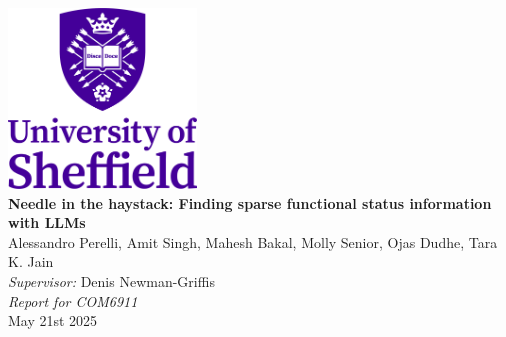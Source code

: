 \documentclass[11pt,oneside]{book}
\begin{document}
\frontmatter

\begin{titlepage}

\begin{center}
\includegraphics[width=5cm]{images/UOSLogo_Portrait_Violet_RGB.png}\\[2cm]
\linespread{1.2}\huge {\bfseries Needle in the haystack: Finding sparse functional status
information with LLMs}\\[2cm]
\linespread{1}
{\Large Alessandro Perelli, Amit Singh, Mahesh Bakal, Molly Senior, Ojas Dudhe, Tara K. Jain}\\[1cm]
{\large \emph{Supervisor:}  Denis Newman-Griffis}\\[1cm]
\large \emph{Report for COM6911} \\[1cm]
May 21st 2025
\end{center}


\end{titlepage}

\newpage

\tableofcontents


\mainmatter



\end{document}
